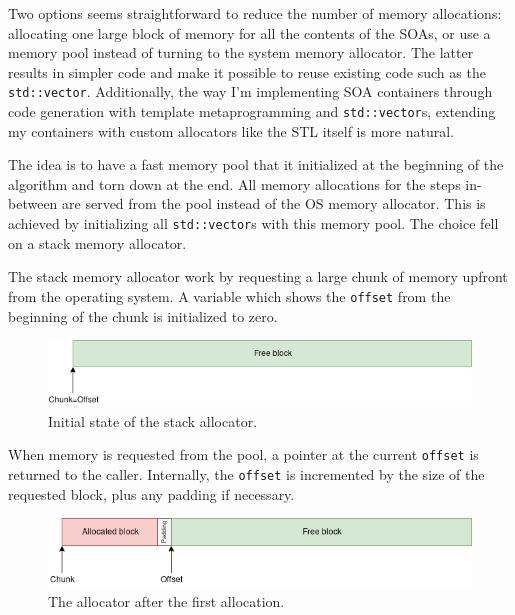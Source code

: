 \documentclass[12pt]{article}
\newcommand{\code}[1]{\texttt{#1}}
\begin{document}
\vspace{1pc}

Two options seems straightforward to reduce the number of memory allocations: allocating one large block of memory for all the contents of the SOAs, or use a memory pool instead of turning to the system memory allocator. The latter results in simpler code and make it possible to reuse existing code such as the \code{std::vector}. Additionally, the way I'm implementing SOA containers through code generation with template metaprogramming and \code{std::vector}s, extending my containers with custom allocators like the STL itself is more natural.

\vspace{1pc}

The idea is to have a fast memory pool that it initialized at the beginning of the algorithm and torn down at the end. All memory allocations for the steps in-between are served from the pool instead of the OS memory allocator. This is achieved by initializing all \code{std::vector}s with this memory pool.
The choice fell on a stack memory allocator.

\vspace{1pc}

The stack memory allocator work by requesting a large chunk of memory upfront from the operating system. A variable which shows the \code{offset} from the beginning of the chunk is initialized to zero.

\begin{figure}[H]
	\begin{center}
		\includegraphics[width=\textwidth]{velout_stack_allocator_initial}
	\end{center}
	\caption{Initial state of the stack allocator.}
	\label{fig_velout_stack_allocator_initial}
\end{figure}

When memory is requested from the pool, a pointer at the current \code{offset} is returned to the caller. Internally, the \code{offset} is incremented by the size of the requested block, plus any padding if necessary.

\begin{figure}[H]
	\begin{center}
		\includegraphics[width=\textwidth]{velout_stack_allocator_alloc1}
	\end{center}
	\caption{The allocator after the first allocation.}
	\label{fig_velout_stack_allocator_alloc1}
\end{figure}
\end{document}
